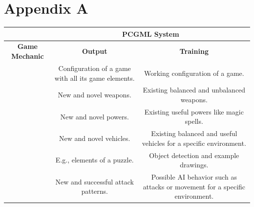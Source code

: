 \documentclass[MGS,Master,english]{twbook}%
\begin{document}
%
%
\clearpage
\appendix
\chapter{Appendix A} \label{gameMechanicIdeaSummary}
\begin{landscape}
	\begin{table}[tp]
		\centering
		\resizebox{\textheight}{!}
		{%
			\begin{tabular}{c|c|c|}
				\cline{2-3}
				\textbf{}                                                                     & \multicolumn{2}{|c|}{\textbf{PCGML System}}                                                                                                   \\ \hline
				\multicolumn{1}{|c||}{\textbf{Game Mechanic}}                                  & \textbf{Output}                                      & \textbf{Training}                                                                     \\ \hline\hline
				\multicolumn{1}{|c||}{\nameref{idea::rulesAndBehavior}}       & Configuration of a game with all its game elements.  & Working configuration of a game.                                                      \\ \hline
				\multicolumn{1}{|c||}{\nameref{idea::changingWeapons}}        & New and novel weapons.                               & Existing balanced and unbalanced weapons.                                             \\ \hline
				\multicolumn{1}{|c||}{\nameref{idea::changingPowers}}         & New and novel powers.                                & Existing useful powers like magic spells.                                             \\ \hline
				\multicolumn{1}{|c||}{\nameref{idea::novelCars}}              & New and novel vehicles.                              & Existing balanced and useful vehicles for a specific environment.                     \\ \hline
				\multicolumn{1}{|c||}{\nameref{idea::solverWeapon}}           & E.g., elements of a puzzle.                          & Object detection and example drawings.                                                \\ \hline
				\multicolumn{1}{|c||}{\nameref{idea::defeatTheEnemy}}         & New and successful attack patterns.                  & Possible AI behavior such as attacks or movement for a specific environment.          \\ \hline

\end{tabular}}
\end{table}
\end{landscape}
\end{document}
